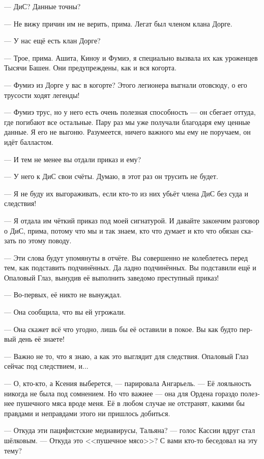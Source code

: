 \documentclass[a4paper,12pt,fleqn]{book}\usepackage{cooltooltips}\usepackage{polyglossia}\setdefaultlanguage[babelshorthands=true]{russian}\setotherlanguage{english}\defaultfontfeatures{Ligatures=TeX,Mapping=tex-text} \usepackage{xcolor}\definecolor{lightgray}{HTML}{bbbbbb}\color{lightgray}\newcommand{\ml}[3]{\textenglish{\textcolor{black}{#3}}}
\begin{document}
--- ДиС?
Данные точны?

--- Не вижу причин им не верить, прима.
Легат был членом клана Дорге.

--- У нас ещё есть клан Дорге?

--- Трое, прима.
Ашита, Киноу и Фумиэ, я специально вызвала их как уроженцев Тысячи Башен.
Они предупреждены, как и вся когорта.

--- Фумиэ из Дорге у вас в когорте?
Этого легионера выгнали отовсюду, о его трусости ходят легенды!

--- Фумиэ трус, но у него есть очень полезная способность --- он сбегает оттуда, где погибают все остальные.
Пару раз мы уже получали благодаря ему ценные данные.
Я его не выгоню.
Разумеется, ничего важного мы ему не поручаем, он идёт балластом.

--- И тем не менее вы отдали приказ и ему?

--- У него к ДиС свои счёты.
Думаю, в этот раз он трусить не будет.

--- Я не буду их выгораживать, если кто-то из них убьёт члена ДиС без суда и следствия!

--- Я отдала им чёткий приказ под моей сигнатурой.
И давайте закончим разговор о ДиС, прима, потому что мы и так знаем, кто что думает и кто что обязан сказать по этому поводу.

--- Эти слова будут упомянуты в отчёте.
Вы совершенно не колеблетесь перед тем, как подставить подчинённых.
Да ладно подчинённых.
Вы подставили ещё и Опаловый Глаз, вынудив её выполнить заведомо преступный приказ!

--- Во-первых, её никто не вынуждал.

--- Она сообщила, что вы ей угрожали.

--- Она скажет всё что угодно, лишь бы её оставили в покое.
Вы как будто первый день её знаете!

--- Важно не то, что я знаю, а как это выглядит для следствия.
Опаловый Глаз сейчас под следствием, и...

--- О, кто-кто, а Ксения выберется, --- парировала Ангарьель.
--- Её лояльность никогда не была под сомнением.
Но что важнее --- она для Ордена гораздо полезнее пушечного мяса вроде меня.
Её в любом случае не отстранят, какими бы правдами и неправдами этого ни пришлось добиться.

--- Откуда эти пацифистские медиавирусы, Тальяна? --- голос Кассии вдруг стал шёлковым.
--- Откуда это <<пушечное мясо>>?
С вами кто-то беседовал на эту тему?
\end{document}
